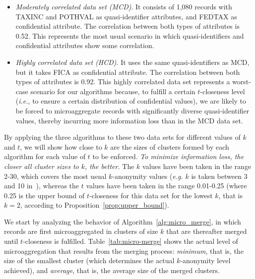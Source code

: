 \documentclass[10pt,journal,compsoc]{IEEEtran}
\theoremstyle{definition}
\theoremstyle{plain}
\begin{document}
\begin{itemize}
\item {\em Moderately correlated data set (MCD)}. It consists of 
1,080 records with TAXINC and POTHVAL 
as quasi-identifier attributes, and FEDTAX as confidential attribute. The correlation 
between both types of attributes is 0.52. This represents the most 
usual scenario in which quasi-identifiers and confidential attributes 
show some correlation. 
\item {\em Highly correlated data set (HCD)}. 
It uses the same quasi-identifiers as MCD,
but it takes FICA as confidential attribute. The correlation between
both types of attributes is 0.92. This highly correlated data set represents
a worst-case scenario for our algorithms because, to fulfill a certain 
$t$-closeness level 
({\em i.e.}, to ensure a certain distribution of confidential values), 
we are likely to be forced to microaggregate records
with significantly diverse quasi-identifier values, thereby 
incurring more information loss than in the MCD data set.
\end{itemize}

By applying the three algorithms to these two data sets
for different values of $k$ and $t$, we will show 
how close to $k$ are the sizes of clusters formed by 
each algorithm for each value of $t$ to be enforced.
{\em To minimize information loss, the closer 
all cluster sizes to $k$, the better.}
The $k$ values have been taken in the range 2-30, 
which covers the most usual $k$-anonymity values ({\em e.g.} 
$k$ is taken between 3 and 10 in~\cite{Domingo01}),
whereas the $t$ values have been taken in the range 0.01-0.25 
(where 0.25 is the upper bound of $t$-closeness for this data set for 
the lowest $k$, that is $k=2$, 
according to Proposition~\ref{prop:upper_bound}).

We start by analyzing the behavior of Algorithm~\ref{alg:micro_merge}, 
in which records are first microaggregated in clusters of size $k$ that 
are thereafter merged until $t$-closeness is fulfilled. Table~\ref{tab:micro-merge} shows the
actual level of microaggregation that results from the merging process: 
{\em minimum}, that is, the size of the smallest cluster 
(which determines the actual $k$-anonymity level achieved), 
and {\em average},
that is, the average size of the merged clusters.
\end{document}
